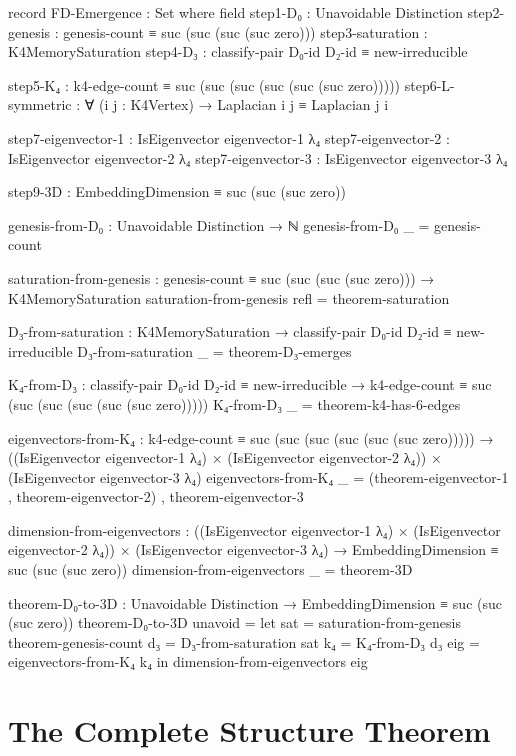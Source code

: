 \documentclass[11pt,a4paper]{book}
\begin{document}
\begin{code}
record FD-Emergence : Set where
  field
    step1-D₀          : Unavoidable Distinction
    step2-genesis     : genesis-count ≡ suc (suc (suc (suc zero)))
    step3-saturation  : K4MemorySaturation
    step4-D₃          : classify-pair D₀-id D₂-id ≡ new-irreducible
    
    step5-K₄          : k4-edge-count ≡ suc (suc (suc (suc (suc (suc zero)))))
    step6-L-symmetric : ∀ (i j : K4Vertex) → Laplacian i j ≡ Laplacian j i
    
    step7-eigenvector-1 : IsEigenvector eigenvector-1 λ₄
    step7-eigenvector-2 : IsEigenvector eigenvector-2 λ₄
    step7-eigenvector-3 : IsEigenvector eigenvector-3 λ₄
    
    step9-3D          : EmbeddingDimension ≡ suc (suc (suc zero))

genesis-from-D₀ : Unavoidable Distinction → ℕ
genesis-from-D₀ _ = genesis-count

saturation-from-genesis : genesis-count ≡ suc (suc (suc (suc zero))) → K4MemorySaturation
saturation-from-genesis refl = theorem-saturation

D₃-from-saturation : K4MemorySaturation → classify-pair D₀-id D₂-id ≡ new-irreducible
D₃-from-saturation _ = theorem-D₃-emerges

K₄-from-D₃ : classify-pair D₀-id D₂-id ≡ new-irreducible → 
             k4-edge-count ≡ suc (suc (suc (suc (suc (suc zero)))))
K₄-from-D₃ _ = theorem-k4-has-6-edges

eigenvectors-from-K₄ : k4-edge-count ≡ suc (suc (suc (suc (suc (suc zero))))) →
  ((IsEigenvector eigenvector-1 λ₄) × (IsEigenvector eigenvector-2 λ₄)) × 
  (IsEigenvector eigenvector-3 λ₄)
eigenvectors-from-K₄ _ = (theorem-eigenvector-1 , theorem-eigenvector-2) , theorem-eigenvector-3

dimension-from-eigenvectors : 
  ((IsEigenvector eigenvector-1 λ₄) × (IsEigenvector eigenvector-2 λ₄)) × 
  (IsEigenvector eigenvector-3 λ₄) → EmbeddingDimension ≡ suc (suc (suc zero))
dimension-from-eigenvectors _ = theorem-3D

theorem-D₀-to-3D : Unavoidable Distinction → EmbeddingDimension ≡ suc (suc (suc zero))
theorem-D₀-to-3D unavoid = 
  let sat = saturation-from-genesis theorem-genesis-count
      d₃  = D₃-from-saturation sat
      k₄  = K₄-from-D₃ d₃
      eig = eigenvectors-from-K₄ k₄
  in dimension-from-eigenvectors eig
\end{code}

\section{The Complete Structure Theorem}
\end{document}
